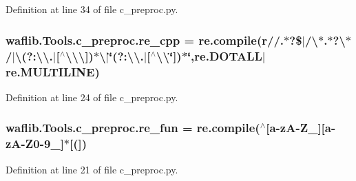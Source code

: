 Definition at line 34 of file c\+\_\+preproc.\+py.

\subsubsection[{\texorpdfstring{re\+\_\+cpp}{re_cpp}}]{\setlength{\rightskip}{0pt plus 5cm}waflib.\+Tools.\+c\+\_\+preproc.\+re\+\_\+cpp = re.\+compile(r\textquotesingle{}//.$\ast$?\$$\vert$/\textbackslash{}$\ast$.$\ast$?\textbackslash{}$\ast$/$\vert$\textbackslash{}\textquotesingle{}(?\+:\textbackslash{}\textbackslash{}.$\vert$\mbox{[}$^\wedge$\textbackslash{}\textbackslash{}\textbackslash{}\textquotesingle{}\mbox{]})$\ast$\textbackslash{}\textquotesingle{}$\vert$\char`\"{}(?\+:\textbackslash{}\textbackslash{}.$\vert$\mbox{[}$^\wedge$\textbackslash{}\textbackslash{}\char`\"{}\mbox{]})$\ast$\char`\"{}\textquotesingle{},re.\+D\+O\+T\+A\+LL$\vert$re.\+M\+U\+L\+T\+I\+L\+I\+NE)}\hypertarget{namespacewaflib_1_1_tools_1_1c__preproc_a8a1e57dde7903dbe363d2107f6f98dc4}{}\label{namespacewaflib_1_1_tools_1_1c__preproc_a8a1e57dde7903dbe363d2107f6f98dc4}


Definition at line 24 of file c\+\_\+preproc.\+py.

\subsubsection[{\texorpdfstring{re\+\_\+fun}{re_fun}}]{\setlength{\rightskip}{0pt plus 5cm}waflib.\+Tools.\+c\+\_\+preproc.\+re\+\_\+fun = re.\+compile(\textquotesingle{}$^\wedge$\mbox{[}{\bf a}-\/zA-\/Z\+\_\+\mbox{]}\mbox{[}{\bf a}-\/zA-\/Z0-\/9\+\_\+\mbox{]}$\ast$\mbox{[}(\mbox{]}\textquotesingle{})}\hypertarget{namespacewaflib_1_1_tools_1_1c__preproc_acbad3a507aabd2e02a63ebe46aff8539}{}\label{namespacewaflib_1_1_tools_1_1c__preproc_acbad3a507aabd2e02a63ebe46aff8539}


Definition at line 21 of file c\+\_\+preproc.\+py.

